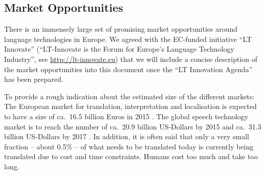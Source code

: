 \documentclass[10pt, plain]{../../metanetpaper}
\begin{document}
\begin{multicols}{2}
\subsection{Market Opportunities}
\label{sec:market-opportunities}

%


There is an immensely large set of promising market opportunities around language technologies in Europe. We agreed with the EC-funded initiative ``LT Innovate'' (``LT-Innovate is the Forum for Europe's Language Technology Industry'', see \url{http://lt-innovate.eu}) that we will include a concise description of the market opportunities into this document once the ``LT Innovation Agenda'' has been prepared.

To provide a rough indication about the estimated size of the different markets: The European market for translation, interpretation and localisation is expected to have a size of ca.~16.5 billion Euros in 2015 \cite{EC3}. The global speech technology market is to reach the number of ca.~20.9 billion US-Dollars by 2015 and ca.~31.3 billion US-Dollars by 2017 \cite{gia2012}. In addition, it is often said that only a very small fraction -- about 0.5\% -- of what needs to be translated today is currently being translated due to cost and time constraints. Humans cost too much and take too long.
\end{multicols}

\clearpage


\end{document}
